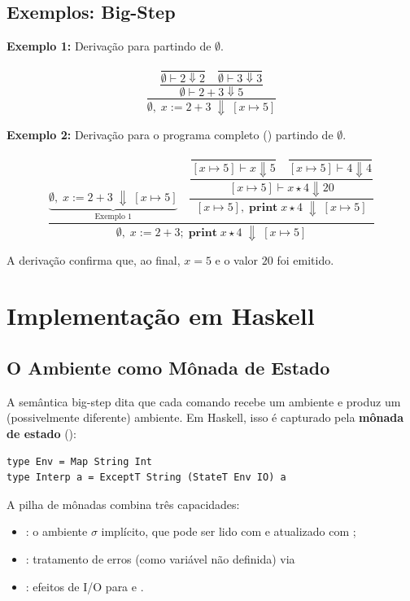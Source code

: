 \subsection{Exemplos: Big-Step}\label{exemplos-big-step}

\textbf{Exemplo 1:} Derivação para  partindo de \(\emptyset\).

\[
  \dfrac{
    \dfrac{
      \dfrac{}{\emptyset \vdash 2 \Downarrow 2}
      \quad
      \dfrac{}{\emptyset \vdash 3 \Downarrow 3}
    }{\emptyset \vdash 2 + 3 \Downarrow 5}
  }{\emptyset,\; x \mathbin{:=} 2 + 3 \;\Downarrow\; [x \mapsto 5]}
\]

\textbf{Exemplo 2:} Derivação para o programa completo
() partindo de \(\emptyset\).

\[
  \dfrac{
    \underbrace{\emptyset,\; x \mathbin{:=} 2+3 \;\Downarrow\; [x
    \mapsto 5]}_{\text{Exemplo 1}}
    \quad
    \dfrac{
      \dfrac{
        \dfrac{}{[x\mapsto 5] \vdash x \Downarrow 5}
        \quad
        \dfrac{}{[x\mapsto 5] \vdash 4 \Downarrow 4}
      }{[x\mapsto 5] \vdash x \star 4 \Downarrow 20}
    }{[x\mapsto 5],\; \mathbf{print}\; x\star 4 \;\Downarrow\; [x\mapsto 5]}
  }{\emptyset,\; x \mathbin{:=} 2+3;\; \mathbf{print}\; x\star 4
  \;\Downarrow\; [x\mapsto 5]}
\]

A derivação confirma que, ao final, \(x = 5\) e o valor \(20\) foi emitido.

\section{Implementação em Haskell}

\subsection{O Ambiente como Mônada de Estado}

A semântica big-step dita que cada comando recebe um ambiente e
produz um (possivelmente diferente) ambiente. Em Haskell, isso é
capturado pela \textbf{mônada de estado} ():

\begin{verbatim}
type Env = Map String Int
type Interp a = ExceptT String (StateT Env IO) a
\end{verbatim}

A pilha de mônadas combina três capacidades:
\begin{itemize}
  \item {}: o ambiente \(\sigma\)
    implícito, que pode ser lido com  e
    atualizado com ;
  \item  {}: tratamento de erros
    (como variável não definida) via 
  \item {}: efeitos de I/O para
     e .
\end{itemize}

